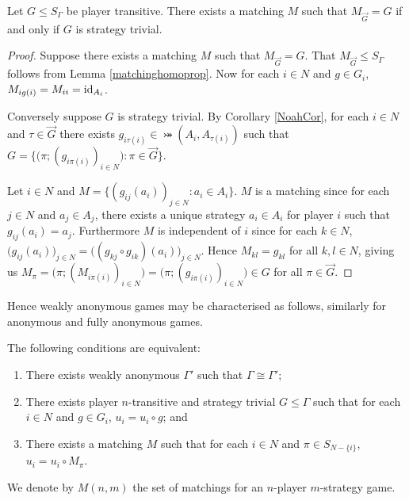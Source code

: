 \begin{theorem} \label{strattrivmatchingthm}
	Let $G \leq S_{\Gamma}$ be player transitive. There exists a matching $M$ such that $M_{\overrightarrow{G}} = G$ if and only if $G$ is strategy trivial.
	\begin{proof}
		Suppose there exists a matching $M$ such that $M_{\overrightarrow{G}} = G$. That $M_{\overrightarrow{G}} \leq S_{\Gamma}$ follows from Lemma \ref{matchinghomoprop}. Now for each $i \in N$ and $g \in G_i$, $M_{ig(i)} = M_{ii} = \text{id}_{A_i}$.
		
		Conversely suppose $G$ is strategy trivial. By Corollary \ref{NoahCor}, for each $i \in N$ and $\tau \in \overrightarrow{G}$ there exists $g_{i\tau(i)} \in \bij(A_i, A_{\tau(i)})$ such that $G = \{\bigl(\pi; (g_{i\pi(i)})_{i \in N}\bigr): \pi \in \overrightarrow{G}\}$. 
		
		Let $i \in N$ and $M = \{(g_{ij}(a_i))_{j \in N}: a_i \in A_i\}$. $M$ is a matching since for each $j \in N$ and $a_j \in A_j$, there exists a unique strategy $a_i \in A_i$ for player $i$ such that $g_{ij}(a_i) = a_j$. Furthermore $M$ is independent of $i$ since for each $k \in N$, $\bigl(g_{ij}(a_i)\bigr)_{j \in N} = \bigl((g_{kj} \circ g_{ik})(a_i)\bigr)_{j \in N}$. Hence $M_{kl} = g_{kl}$ for all $k, l \in N$, giving us $M_{\pi} = \bigl(\pi; (M_{i\pi(i)})_{i \in N}\bigr) = \bigl(\pi; (g_{i\pi(i)})_{i \in N}\bigr) \in G$ for all $\pi \in \overrightarrow{G}$.
	\end{proof} 
\end{theorem}

Hence weakly anonymous games may be characterised as follows, similarly for anonymous and fully anonymous games.

\begin{corollary}
	The following conditions are equivalent:
	\begin{enumerate}
		\item There exists weakly anonymous $\Gamma'$ such that $\Gamma \cong \Gamma'$;
		\item There exists player $n$-transitive and strategy trivial $G \leq \Gamma$ such that for each $i \in N$ and $g \in G_i$, $u_i = u_i \circ g$; and
		\item There exists a matching $M$ such that for each $i \in N$ and $\pi \in S_{N-\{i\}}$, $u_i = u_i \circ M_{\pi}$.
	\end{enumerate}
\end{corollary}

We denote by $M(n, m)$ the set of matchings for an $n$-player $m$-strategy game. 

